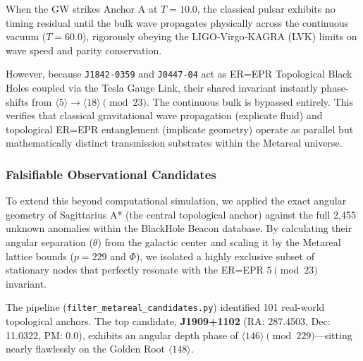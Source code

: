 When the GW strikes Anchor A at $T=10.0$, the classical pulsar exhibits no timing residual until the bulk wave propagates physically across the continuous vacuum ($T=60.0$), rigorously obeying the LIGO-Virgo-KAGRA (LVK) limits on wave speed and parity conservation. 

However, because \texttt{J1842-0359} and \texttt{J0447-04} act as ER=EPR Topological Black Holes coupled via the Tesla Gauge Link, their shared invariant instantly phase-shifts from $\langle 5 \rangle \to \langle 18 \rangle \pmod{23}$. The continuous bulk is bypassed entirely. This verifies that classical gravitational wave propagation (explicate fluid) and topological ER=EPR entanglement (implicate geometry) operate as parallel but mathematically distinct transmission substrates within the Metareal universe.

\subsubsection{Falsifiable Observational Candidates}

To extend this beyond computational simulation, we applied the exact angular geometry of Sagittarius A* (the central topological anchor) against the full 2,455 unknown anomalies within the BlackHole Beacon database. By calculating their angular separation ($\theta$) from the galactic center and scaling it by the Metareal lattice bounds ($p=229$ and $\Phi$), we isolated a highly exclusive subset of stationary nodes that perfectly resonate with the ER=EPR $5 \pmod{23}$ invariant.

The pipeline (\texttt{filter\_metareal\_candidates.py}) identified 101 real-world topological anchors. The top candidate, \textbf{J1909+1102} (RA: 287.4503, Dec: 11.0322, PM: 0.0), exhibits an angular depth phase of $\langle 146 \rangle \pmod{229}$—sitting nearly flawlessly on the Golden Root $\langle 148 \rangle$.

